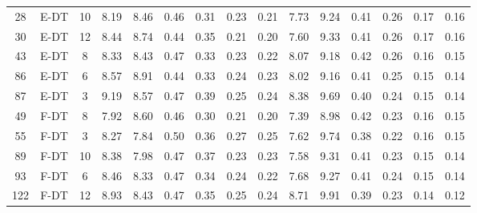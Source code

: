 \begin{table}
\begin{tabular}{@{\hskip3pt}c@{\hskip3pt}c@{\hskip3pt}c@{\hskip3pt}c@{\hskip3pt}c@{\hskip3pt}c@{\hskip3pt}c@{\hskip3pt}c@{\hskip3pt}c@{\hskip3pt}c@{\hskip3pt}c@{\hskip3pt}c@{\hskip3pt}c@{\hskip3pt}c@{\hskip3pt}c}
         28 &           E-DT &                  10 &              8.19 &        8.46 &          0.46 &        0.31 &        0.23 &         0.21 &                7.73 &        9.24 &          0.41 &        0.26 &        0.17 &         0.16 \\
         30 &           E-DT &                  12 &              8.44 &        8.74 &          0.44 &        0.35 &        0.21 &         0.20 &                7.60 &        9.33 &          0.41 &        0.26 &        0.17 &         0.16 \\
         43 &           E-DT &                   8 &              8.33 &        8.43 &          0.47 &        0.33 &        0.23 &         0.22 &                8.07 &        9.18 &          0.42 &        0.26 &        0.16 &         0.15 \\
         86 &           E-DT &                   6 &              8.57 &        8.91 &          0.44 &        0.33 &        0.24 &         0.23 &                8.02 &        9.16 &          0.41 &        0.25 &        0.15 &         0.14 \\
         87 &           E-DT &                   3 &              9.19 &        8.57 &          0.47 &        0.39 &        0.25 &         0.24 &                8.38 &        9.69 &          0.40 &        0.24 &        0.15 &         0.14 \\
         49 &           F-DT &                   8 &              7.92 &        8.60 &          0.46 &        0.30 &        0.21 &         0.20 &                7.39 &        8.98 &          0.42 &        0.23 &        0.16 &         0.15 \\
         55 &           F-DT &                   3 &              8.27 &        7.84 &          0.50 &        0.36 &        0.27 &         0.25 &                7.62 &        9.74 &          0.38 &        0.22 &        0.16 &         0.15 \\
         89 &           F-DT &                  10 &              8.38 &        7.98 &          0.47 &        0.37 &        0.23 &         0.23 &                7.58 &        9.31 &          0.41 &        0.23 &        0.15 &         0.14 \\
         93 &           F-DT &                   6 &              8.46 &        8.33 &          0.47 &        0.34 &        0.24 &         0.22 &                7.68 &        9.27 &          0.41 &        0.24 &        0.15 &         0.14 \\
        122 &           F-DT &                  12 &              8.93 &        8.43 &          0.47 &        0.35 &        0.25 &         0.24 &                8.71 &        9.91 &          0.39 &        0.23 &        0.14 &         0.12 \\
\bottomrule
\end{tabular}
\end{table}

